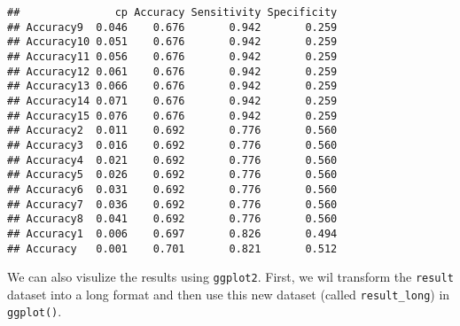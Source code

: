 \documentclass[
]{book}
\newenvironment{Shaded}{\begin{snugshade}}{\end{snugshade}}
\newcommand{\AttributeTok}[1]{\textcolor[rgb]{0.77,0.63,0.00}{#1}}
\newcommand{\ConstantTok}[1]{\textcolor[rgb]{0.00,0.00,0.00}{#1}}
\newcommand{\ControlFlowTok}[1]{\textcolor[rgb]{0.13,0.29,0.53}{\textbf{#1}}}
\newcommand{\FloatTok}[1]{\textcolor[rgb]{0.00,0.00,0.81}{#1}}
\newcommand{\FunctionTok}[1]{\textcolor[rgb]{0.00,0.00,0.00}{#1}}
\newcommand{\NormalTok}[1]{#1}
\newcommand{\OtherTok}[1]{\textcolor[rgb]{0.56,0.35,0.01}{#1}}
\newcommand{\SpecialCharTok}[1]{\textcolor[rgb]{0.00,0.00,0.00}{#1}}
\begin{document}
\begin{Shaded}
\end{Shaded}

\begin{verbatim}
##               cp Accuracy Sensitivity Specificity
## Accuracy9  0.046    0.676       0.942       0.259
## Accuracy10 0.051    0.676       0.942       0.259
## Accuracy11 0.056    0.676       0.942       0.259
## Accuracy12 0.061    0.676       0.942       0.259
## Accuracy13 0.066    0.676       0.942       0.259
## Accuracy14 0.071    0.676       0.942       0.259
## Accuracy15 0.076    0.676       0.942       0.259
## Accuracy2  0.011    0.692       0.776       0.560
## Accuracy3  0.016    0.692       0.776       0.560
## Accuracy4  0.021    0.692       0.776       0.560
## Accuracy5  0.026    0.692       0.776       0.560
## Accuracy6  0.031    0.692       0.776       0.560
## Accuracy7  0.036    0.692       0.776       0.560
## Accuracy8  0.041    0.692       0.776       0.560
## Accuracy1  0.006    0.697       0.826       0.494
## Accuracy   0.001    0.701       0.821       0.512
\end{verbatim}

We can also visulize the results using \texttt{ggplot2}. First, we wil transform the \texttt{result} dataset into a long format and then use this new dataset (called \texttt{result\_long}) in \texttt{ggplot()}.
\end{document}
